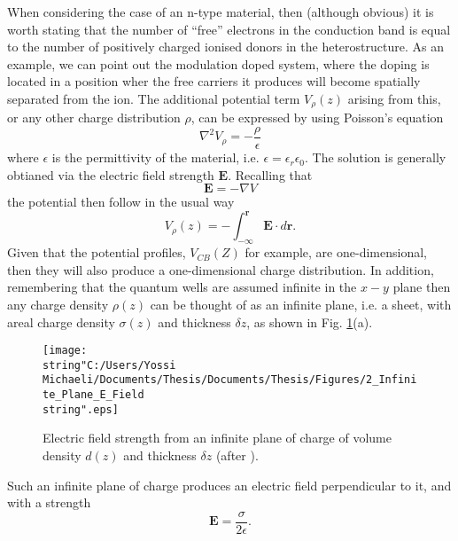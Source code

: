 When considering the case of an n-type material, then (although obvious)
it is worth stating that the number of {}``free'' electrons in the
conduction band is equal to the number of positively charged ionised
donors in the heterostructure. As an example, we can point out the
modulation doped system, where the doping is located in a position
wher the free carriers it produces will become spatially separated
from the ion. The additional potential term $V_{\rho}(z)$ arising
from this, or any other charge distribution $\rho$, can be expressed
by using Poisson's equation\begin{equation}
\nabla^{2}V_{\rho}=-\frac{\rho}{\epsilon}\label{eq:Poissons_Eq}\end{equation}
where $\epsilon$ is the permittivity of the material, i.e. $\epsilon=\epsilon_{r}\epsilon_{0}$.
The solution is generally obtianed via the electric field strength
$\mathbf{E}$. Recalling that \begin{equation}
\mathbf{E}=-\nabla V\end{equation}
the potential then follow in the usual way \citet{Jackson1998} \begin{equation}
V_{\rho}(z)=-\int_{-\infty}^{\mathbf{r}}\mathbf{E}\cdot d\mathbf{r}.\label{eq:Poisson_Potential}\end{equation}
Given that the potential profiles, $V_{CB}(Z)$ for example, are one-dimensional,
then they will also produce a one-dimensional charge distribution.
In addition, remembering that the quantum wells are assumed infinite
in the $x-y$ plane then any charge density $\rho(z)$ can be thought
of as an infinite plane, i.e. a sheet, with areal charge density $\sigma(z)$
and thickness $\delta z$, as shown in Fig. \ref{fig:Electric_Field_Enfinite_Plane}(a).
%
\begin{figure}
\begin{centering}
\texttt{[image: \\string"C:/Users/Yossi Michaeli/Documents/Thesis/Documents/Thesis/Figures/2\_Infinite\_Plane\_E\_Field\\string".eps]}
\par\end{centering}

\caption{\label{fig:Electric_Field_Enfinite_Plane}Electric field strength
from an infinite plane of charge of volume density $d(z)$ and thickness
$\delta z$ (after \citet{harrison_quantum_2000}).}



\end{figure}
Such an infinite plane of charge produces an electric field perpendicular
to it, and with a strength\begin{equation}
\mathbf{E}=\frac{\sigma}{2\epsilon}.\end{equation}

